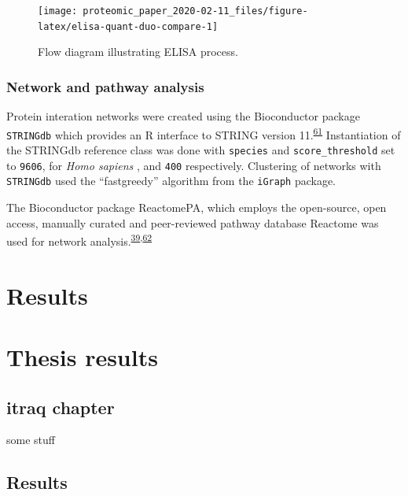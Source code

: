 \documentclass[
]{article}
\begin{document}
\clearpage



\begin{figure}
\texttt{[image: proteomic\_paper\_2020-02-11\_files/figure-latex/elisa-quant-duo-compare-1]} \caption{Flow diagram illustrating ELISA process.}\label{fig:elisa-quant-duo-compare}
\end{figure}

\hypertarget{pathway-analysis-chap3}{%
\subsubsection{Network and pathway analysis}\label{pathway-analysis-chap3}}

Protein interation networks were created using the Bioconductor package \texttt{STRINGdb} which provides an R interface to STRING version 11.\textsuperscript{\protect\hyperlink{ref-szklarczyk_string_2019}{61}}
Instantiation of the STRINGdb reference class was done with \texttt{species} and \texttt{score\_threshold} set to \texttt{9606}, for \emph{Homo sapiens} , and \texttt{400} respectively.
Clustering of networks with \texttt{STRINGdb} used the ``fastgreedy'' algorithm from the \texttt{iGraph} package.

The Bioconductor package ReactomePA, which employs the open-source, open access, manually curated and peer-reviewed pathway database Reactome was used for network analysis.\textsuperscript{\protect\hyperlink{ref-yu_reactomepa_2016}{39},\protect\hyperlink{ref-jassal_reactome_2020}{62}}

\hypertarget{results}{%
\section{Results}\label{results}}

\hypertarget{thesis-results}{%
\section{Thesis results}\label{thesis-results}}

\hypertarget{itraq-chapter}{%
\subsection{itraq chapter}\label{itraq-chapter}}

some stuff

\hypertarget{chap-3-results}{%
\subsection{Results}\label{chap-3-results}}
\end{document}
